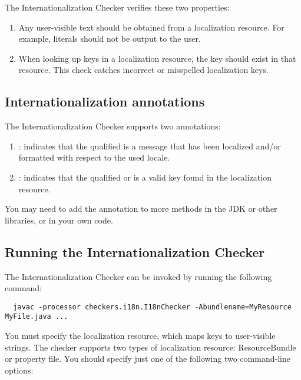 The Internationalization Checker verifies these two properties:

\begin{enumerate}

\item
  Any user-visible text should be obtained from a localization resource.
  For example,  literals should not be output to the user.

\item
  When looking up keys in a localization resource, the key should exist in
  that resource.  This check catches incorrect or misspelled localization
  keys.

\end{enumerate}


\subsection{Internationalization annotations\label{i18n-annotations}}

The Internationalization Checker supports two annotations:

\begin{enumerate}
\item {}: indicates that the qualified
 is a message that has been localized and/or formatted with
respect to the used locale.

\item {}: indicates that the
qualified  or  is a valid key found in the
localization resource.
\end{enumerate}

You may need to add the  annotation to more methods in the
JDK or other libraries, or in your own code.


\subsection{Running the Internationalization Checker\label{i18n-running}}

The Internationalization Checker can be invoked by running the following
command:

\begin{Verbatim}
  javac -processor checkers.i18n.I18nChecker -Abundlename=MyResource MyFile.java ...
\end{Verbatim}

You must specify the localization resource, which maps keys to user-visible
strings.  The checker supports two types of localization resource:
ResourceBundle or property file.  You should specify just one of the
following two command-line options:

